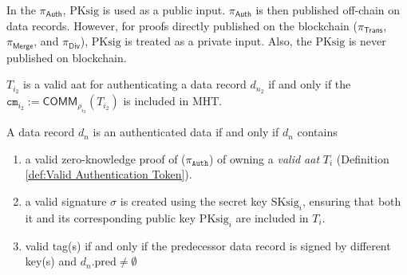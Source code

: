 

\begin{remark} 
In the $\pi_\textsf{Auth}$, $\text{PKsig}$ is used as a public input. $\pi_\textsf{Auth}$ is then published off-chain on data records. However, for proofs directly published on the blockchain ($\pi_\textsf{Trans}$, $\pi_\textsf{Merge}$, and $\pi_\textsf{Div}$), $\text{PKsig}$ is treated as a private input. Also, the $\text{PKsig}$ is never published on blockchain. 
\end{remark}


\begin{definition}
	\label{def:Valid Authentication Token}
	$T_{i_2}$ is a valid \gls{aat} for authenticating a data record $d_{n_2}$ if and only if
	the $\texttt{cm}_{i_2} := \mathsf{COMM}_{\rho_{i_2}}(T_{i_2})$ is included in \textsf{MHT}.
\end{definition}


\begin{definition}
	\label{def:Authenticated Data}
	A data record $d_{n}$ is an authenticated data if and only if $d_{n}$ contains
	\begin{enumerate}
		\item  a valid zero-knowledge proof of ($\pi_\texttt{Auth}$) of owning a \textit{valid \gls{aat}} $T_{i}$ (Definition \ref{def:Valid Authentication Token}).
		\item a valid signature $\sigma$ is created using the secret key $\text{SKsig}_{i}$, ensuring that both it and its corresponding public key $\text{PKsig}_{i}$ are included in $T_{i}$.
		\item valid tag(s) if and only if the predecessor data record is signed by different key(s) and $d_{n}.\text{pred} \neq \emptyset$
	\end{enumerate}
\end{definition}


